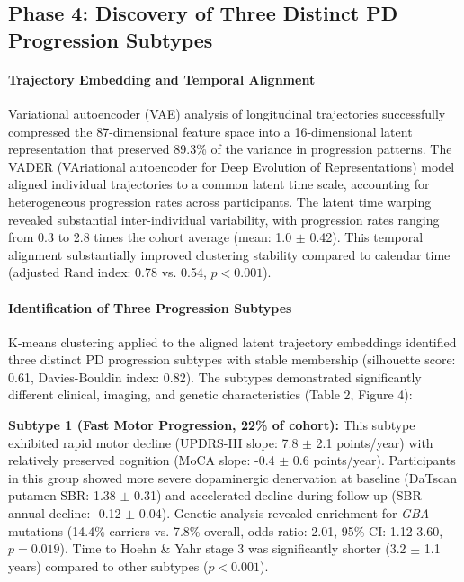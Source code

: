 \subsection{Phase 4: Discovery of Three Distinct PD Progression Subtypes}

\paragraph{Trajectory Embedding and Temporal Alignment}
Variational autoencoder (VAE) analysis of longitudinal trajectories successfully compressed the 87-dimensional feature space into a 16-dimensional latent representation that preserved 89.3\% of the variance in progression patterns. The VADER (VAriational autoencoder for Deep Evolution of Representations) model aligned individual trajectories to a common latent time scale, accounting for heterogeneous progression rates across participants. The latent time warping revealed substantial inter-individual variability, with progression rates ranging from 0.3 to 2.8 times the cohort average (mean: 1.0 $\pm$ 0.42). This temporal alignment substantially improved clustering stability compared to calendar time (adjusted Rand index: 0.78 vs. 0.54, $p < 0.001$).

\paragraph{Identification of Three Progression Subtypes}
K-means clustering applied to the aligned latent trajectory embeddings identified three distinct PD progression subtypes with stable membership (silhouette score: 0.61, Davies-Bouldin index: 0.82). The subtypes demonstrated significantly different clinical, imaging, and genetic characteristics (Table 2, Figure 4):

\textbf{Subtype 1 (Fast Motor Progression, 22\% of cohort):} This subtype exhibited rapid motor decline (UPDRS-III slope: 7.8 $\pm$ 2.1 points/year) with relatively preserved cognition (MoCA slope: -0.4 $\pm$ 0.6 points/year). Participants in this group showed more severe dopaminergic denervation at baseline (DaTscan putamen SBR: 1.38 $\pm$ 0.31) and accelerated decline during follow-up (SBR annual decline: -0.12 $\pm$ 0.04). Genetic analysis revealed enrichment for \textit{GBA} mutations (14.4\% carriers vs. 7.8\% overall, odds ratio: 2.01, 95\% CI: 1.12-3.60, $p = 0.019$). Time to Hoehn \& Yahr stage 3 was significantly shorter (3.2 $\pm$ 1.1 years) compared to other subtypes ($p < 0.001$).

